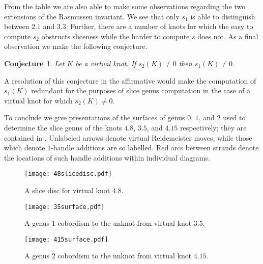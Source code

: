 \documentclass[10pt,oneside]{amsart}
\newtheorem{conjecture}[theorem]{Conjecture}
\theoremstyle{definition}
\numberwithin{equation}{section}
\begin{document}
From the table we are also able to make some observations regarding the two extensions of the Rasmussen invariant. We see that only \( s_1 \) is able to distinguish between \( 2.1 \) and \( 3.3 \). Further, there are a number of knots for which the easy to compute \( s_2 \) obstructs sliceness while the harder to compute \( s \) does not. As a final observation we make the following conjecture.

\begin{conjecture}
	Let \( K \) be a virtual knot. If \( s_2 ( K ) \neq 0 \) then \( s_1 ( K ) \neq 0 \).
\end{conjecture}

A resolution of this conjecture in the affirmative would make the computation of \( s_1 ( K ) \) redundant for the purposes of slice genus computation in the case of a virtual knot for which \( s_2 ( K ) \neq 0 \).

To conclude we give presentations of the surfaces of genus \(0\), \(1\), and \(2\) used to determine the slice genus of the knots \(4.8\), \(3.5\), and \( 4.15 \) respectively; they are contained in . Unlabeled arrows denote virtual Reidemeister moves, while those which denote \(1\)-handle additions are so labelled. Red arcs between strands denote the locations of such handle additions within individual diagrams.

\begin{figure}
	\texttt{[image: 48slicedisc.pdf]}
	\caption{A slice disc for virtual knot \(4.8\).}
	\label{Fig:48slicedisc}
\end{figure}

\begin{figure}
	\texttt{[image: 35surface.pdf]}
	\caption{A genus \(1\) cobordism to the unknot from virtual knot \(3.5\).}
	\label{Fig:35surface}
\end{figure}

\begin{figure}
	\texttt{[image: 415surface.pdf]}
	\caption{A genus \(2\) cobordism to the unknot from virtual knot \(4.15\).}
	\label{Fig:415surface}
\end{figure}



\end{document}
